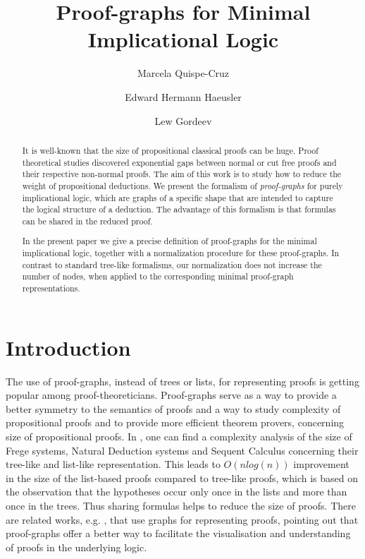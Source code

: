 \documentclass[submission,copyright,creativecommons]{eptcs}
\title{Proof-graphs for Minimal Implicational Logic}
\author{Marcela Quispe-Cruz \institute{Inform\'atica PUC-Rio, Rio de Janeiro, Brazil}
\and Edward Hermann Haeusler \institute{Inform\'atica PUC-Rio, Rio de Janeiro, Brazil}
\and Lew Gordeev \institute{T\"{u}bingen\medskip\ University, Ghent University, PUC-Rio}
}
\begin{document}
\maketitle

\begin{abstract} 
It is well-known that the size of propositional classical proofs can  be huge. 
Proof theoretical studies discovered exponential gaps between  normal or cut free 
proofs and their respective non-normal proofs. The  aim of this work is to study 
how to reduce the weight of propositional deductions. We present the formalism of 
\emph{proof-graphs} for purely implicational logic, which are graphs of a specific shape that are  intended to capture the logical structure of a deduction. 
The advantage of this formalism is that formulas can be shared in the reduced proof.

In the present paper we give a precise definition of proof-graphs for the  minimal
implicational logic, together with a normalization procedure for  these proof-graphs. 
In contrast to standard tree-like formalisms, our normalization does not increase the 
number of nodes, when applied to the corresponding minimal proof-graph representations. 
\end{abstract}

\section{Introduction}

The use of proof-graphs, instead of trees or lists, for representing proofs is getting popular among 
proof-theoreticians. Proof-graphs serve as a way to provide a better symmetry to the 
semantics of proofs \cite{deOliveira2003} and a way to study 
complexity of propositional proofs and to provide more efficient theorem 
provers, concerning size of propositional proofs. In \cite{BonetB1993}, 
one can find a complexity analysis of the size of Frege systems, 
Natural Deduction systems and Sequent Calculus concerning their tree-like and 
list-like representation. This leads to $O(nlog(n))$
improvement in the size of the list-based proofs compared to tree-like proofs, 
which is based on the observation that the hypotheses occur only
once in the lists and more than once in the trees. Thus sharing formulas helps 
to reduce the size of proofs. There are related works, e.g. \cite{Alves2011}, 
that use graphs for representing proofs, pointing out that proof-graphs offer 
a better way to facilitate the visualisation and understanding of proofs in 
the underlying logic.
\end{document}
